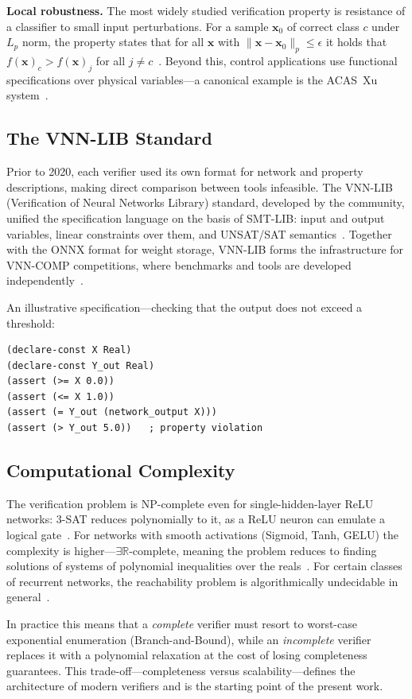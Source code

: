 \textbf{Local robustness.}
The most widely studied verification property is resistance of a classifier
to small input perturbations. For a sample $\mathbf{x}_0$ of correct class $c$
under $L_p$ norm, the property states that for all $\mathbf{x}$ with
$\|\mathbf{x} - \mathbf{x}_0\|_p \le \epsilon$ it holds that
$f(\mathbf{x})_c > f(\mathbf{x})_j$ for all $j \neq c$~\cite{DBLP:journals/corr/abs-2002-03339}.
Beyond this, control applications use functional specifications over physical
variables---a canonical example is the ACAS~Xu system~\cite{Demarchi2023SupportingStandardization}.

\subsection*{The VNN-LIB Standard}

Prior to 2020, each verifier used its own format for network and property
descriptions, making direct comparison between tools infeasible. The VNN-LIB
(Verification of Neural Networks Library) standard, developed by the
community, unified the specification language on the basis of SMT-LIB:
input and output variables, linear constraints over them, and UNSAT/SAT
semantics~\cite{VNNLIBWebsite}. Together with the ONNX format for weight
storage, VNN-LIB forms the infrastructure for VNN-COMP competitions, where
benchmarks and tools are developed independently~\cite{arXiv2212VNNCOMP2022}.

An illustrative specification---checking that the output does not exceed a threshold:
\begin{lstlisting}[caption={Example VNN-LIB specification},label={lst:smtlib}]
(declare-const X Real)
(declare-const Y_out Real)
(assert (>= X 0.0))
(assert (<= X 1.0))
(assert (= Y_out (network_output X)))
(assert (> Y_out 5.0))   ; property violation
\end{lstlisting}

\subsection*{Computational Complexity}

The verification problem is NP-complete even for single-hidden-layer ReLU
networks: 3-SAT reduces polynomially to it, as a ReLU neuron can emulate
a logical gate~\cite{arXiv2403RobustnessVerification}.
For networks with smooth activations (Sigmoid, Tanh, GELU) the complexity is
higher---$\exists\mathbb{R}$-complete, meaning the problem reduces to finding
solutions of systems of polynomial inequalities over the reals~\cite{NeurIPS2021ExistsRComplete}.
For certain classes of recurrent networks, the reachability problem is
algorithmically undecidable in general~\cite{IJCAI2018ReachabilityDNN}.

In practice this means that a \emph{complete} verifier must resort to
worst-case exponential enumeration (Branch-and-Bound), while an
\emph{incomplete} verifier replaces it with a polynomial relaxation at the
cost of losing completeness guarantees. This trade-off---completeness versus
scalability---defines the architecture of modern verifiers and is the starting
point of the present work.
